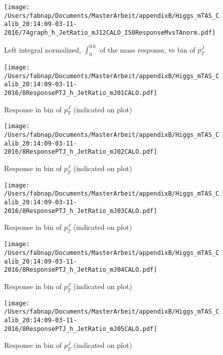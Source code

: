 \begin{figure}

\texttt{[image: /Users/fabnap/Documents/MasterArbeit/appendixB/Higgs\_mTAS\_Calib\_20:14:09-03-11-2016/74graph\_h\_JetRatio\_mJ12CALO\_I50ResponseMvsTAnorm.pdf]}
\caption{Left integral normalized, $\int_{0}^{0.6} $ of the mass response, vs bin of  $p_{T}^{J}$}

\end{figure}
 \clearpage %
\begin{figure}

\texttt{[image: /Users/fabnap/Documents/MasterArbeit/appendixB/Higgs\_mTAS\_Calib\_20:14:09-03-11-2016/8ResponsePTJ\_h\_JetRatio\_mJ01CALO.pdf]}
\caption{Response in bin of  $p_{T}^{J}$ (indicated on plot)} 

\end{figure}

\begin{figure}

\texttt{[image: /Users/fabnap/Documents/MasterArbeit/appendixB/Higgs\_mTAS\_Calib\_20:14:09-03-11-2016/8ResponsePTJ\_h\_JetRatio\_mJ02CALO.pdf]}
\caption{Response in bin of  $p_{T}^{J}$ (indicated on plot)} 

\end{figure}

\begin{figure}

\texttt{[image: /Users/fabnap/Documents/MasterArbeit/appendixB/Higgs\_mTAS\_Calib\_20:14:09-03-11-2016/8ResponsePTJ\_h\_JetRatio\_mJ03CALO.pdf]}
\caption{Response in bin of  $p_{T}^{J}$ (indicated on plot)} 

\end{figure}

\begin{figure}

\texttt{[image: /Users/fabnap/Documents/MasterArbeit/appendixB/Higgs\_mTAS\_Calib\_20:14:09-03-11-2016/8ResponsePTJ\_h\_JetRatio\_mJ04CALO.pdf]}
\caption{Response in bin of  $p_{T}^{J}$ (indicated on plot)} 

\end{figure}

\begin{figure}

\texttt{[image: /Users/fabnap/Documents/MasterArbeit/appendixB/Higgs\_mTAS\_Calib\_20:14:09-03-11-2016/8ResponsePTJ\_h\_JetRatio\_mJ05CALO.pdf]}
\caption{Response in bin of  $p_{T}^{J}$ (indicated on plot)} 

\end{figure}

